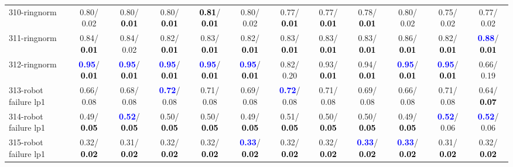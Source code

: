 \begin{table}[h]
\begin{center}
{\begin{tabular}{lc|c|c|c|c|c|c|c|c|c|c}
310-ringnorm &   0.80/  0.02 &   0.80/\textcolor{black}{\textbf{  0.01}} &   0.80/\textcolor{black}{\textbf{  0.01}} & \textcolor{black}{\textbf{  0.81}}/\textcolor{black}{\textbf{  0.01}} &   0.80/  0.02 &   0.77/\textcolor{black}{\textbf{  0.01}} &   0.77/\textcolor{black}{\textbf{  0.01}} &   0.78/\textcolor{black}{\textbf{  0.01}} &   0.80/  0.02 &   0.75/  0.02 &   0.77/  0.02 \\
311-ringnorm &   0.84/\textcolor{black}{\textbf{  0.01}} &   0.84/  0.02 &   0.82/\textcolor{black}{\textbf{  0.01}} &   0.83/\textcolor{black}{\textbf{  0.01}} &   0.82/\textcolor{black}{\textbf{  0.01}} &   0.83/\textcolor{black}{\textbf{  0.01}} &   0.83/\textcolor{black}{\textbf{  0.01}} &   0.83/\textcolor{black}{\textbf{  0.01}} &   0.86/\textcolor{black}{\textbf{  0.01}} &   0.82/\textcolor{black}{\textbf{  0.01}} & \textcolor{blue}{\textbf{  0.88}}/\textcolor{black}{\textbf{  0.01}} \\
312-ringnorm & \textcolor{blue}{\textbf{  0.95}}/\textcolor{black}{\textbf{  0.01}} & \textcolor{blue}{\textbf{  0.95}}/\textcolor{black}{\textbf{  0.01}} & \textcolor{blue}{\textbf{  0.95}}/\textcolor{black}{\textbf{  0.01}} & \textcolor{blue}{\textbf{  0.95}}/\textcolor{black}{\textbf{  0.01}} & \textcolor{blue}{\textbf{  0.95}}/\textcolor{black}{\textbf{  0.01}} &   0.82/  0.20 &   0.93/\textcolor{black}{\textbf{  0.01}} &   0.94/\textcolor{black}{\textbf{  0.01}} & \textcolor{blue}{\textbf{  0.95}}/\textcolor{black}{\textbf{  0.01}} & \textcolor{blue}{\textbf{  0.95}}/\textcolor{black}{\textbf{  0.01}} &   0.66/  0.19 \\
313-robot failure lp1 &   0.66/  0.08 &   0.68/  0.08 & \textcolor{blue}{\textbf{  0.72}}/  0.08 &   0.71/  0.08 &   0.69/  0.08 & \textcolor{blue}{\textbf{  0.72}}/  0.08 &   0.71/  0.08 &   0.69/  0.08 &   0.66/  0.08 &   0.71/  0.08 &   0.64/\textcolor{black}{\textbf{  0.07}} \\
314-robot failure lp1 &   0.49/\textcolor{black}{\textbf{  0.05}} & \textcolor{blue}{\textbf{  0.52}}/\textcolor{black}{\textbf{  0.05}} &   0.50/\textcolor{black}{\textbf{  0.05}} &   0.50/\textcolor{black}{\textbf{  0.05}} &   0.49/\textcolor{black}{\textbf{  0.05}} &   0.51/\textcolor{black}{\textbf{  0.05}} &   0.50/\textcolor{black}{\textbf{  0.05}} &   0.50/\textcolor{black}{\textbf{  0.05}} &   0.49/\textcolor{black}{\textbf{  0.05}} & \textcolor{blue}{\textbf{  0.52}}/  0.06 & \textcolor{blue}{\textbf{  0.52}}/  0.06 \\
315-robot failure lp1 &   0.32/\textcolor{black}{\textbf{  0.02}} &   0.31/\textcolor{black}{\textbf{  0.02}} &   0.32/\textcolor{black}{\textbf{  0.02}} &   0.32/\textcolor{black}{\textbf{  0.02}} & \textcolor{blue}{\textbf{  0.33}}/\textcolor{black}{\textbf{  0.02}} &   0.32/\textcolor{black}{\textbf{  0.02}} &   0.32/\textcolor{black}{\textbf{  0.02}} & \textcolor{blue}{\textbf{  0.33}}/\textcolor{black}{\textbf{  0.02}} & \textcolor{blue}{\textbf{  0.33}}/\textcolor{black}{\textbf{  0.02}} &   0.31/\textcolor{black}{\textbf{  0.02}} &   0.32/\textcolor{black}{\textbf{  0.02}} \\

\end{tabular}}
\end{center}
\end{table}

